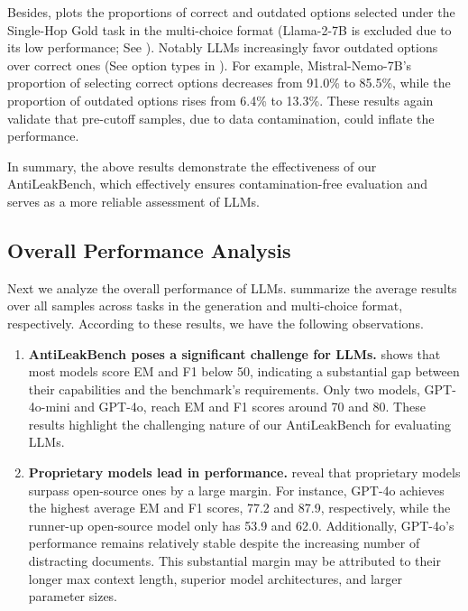 \documentclass[11pt]{article}
\newcommand{\benchname}{{AntiLeakBench}\xspace}
\begin{document}
            Besides,  plots the proportions of correct and outdated options selected under the Single-Hop Gold task in the multi-choice format
            (Llama-2-7B is excluded due to its low performance; See ).
            Notably LLMs increasingly favor outdated options over correct ones (See option types in ).
            For example, Mistral-Nemo-7B's proportion of selecting correct options decreases from 91.0\% to 85.5\%, while the proportion of outdated options rises from 6.4\% to 13.3\%.
            These results again validate that pre-cutoff samples, due to data contamination, could inflate the performance.

        In summary, the above results demonstrate the effectiveness of our \benchname, which effectively ensures contamination-free evaluation
        and serves as a more reliable assessment of LLMs.

    \subsection{Overall Performance Analysis} \label{sec_performance_analysis}
        Next we analyze the overall performance of LLMs.
         summarize the average results over all samples across tasks in the generation and multi-choice format, respectively.
        According to these results, we have the following observations.
        \begin{enumerate}[wide, labelindent=0pt, labelsep=2pt, itemsep=1pt, topsep=1pt, label=\textbf{(\arabic*)}]
            \item
                \textbf{\benchname poses a significant challenge for LLMs.}
                 shows that most models score EM and F1 below 50, indicating a substantial gap between their capabilities and the benchmark's requirements.
                Only two models, GPT-4o-mini and GPT-4o, reach EM and F1 scores around 70 and 80.
                These results highlight the challenging nature of our \benchname for evaluating LLMs.
            \item
                \textbf{Proprietary models lead in performance.}
                 reveal that proprietary models surpass open-source ones by a large margin.
                For instance, GPT-4o achieves the highest average EM and F1 scores, 77.2 and 87.9, respectively,
                while the runner-up open-source model only has 53.9 and 62.0.
                Additionally, GPT-4o's performance remains relatively stable despite the increasing number of distracting documents.
                This substantial margin may be attributed to their longer max context length, superior model architectures, and larger parameter sizes.
        \end{enumerate}
\end{document}
